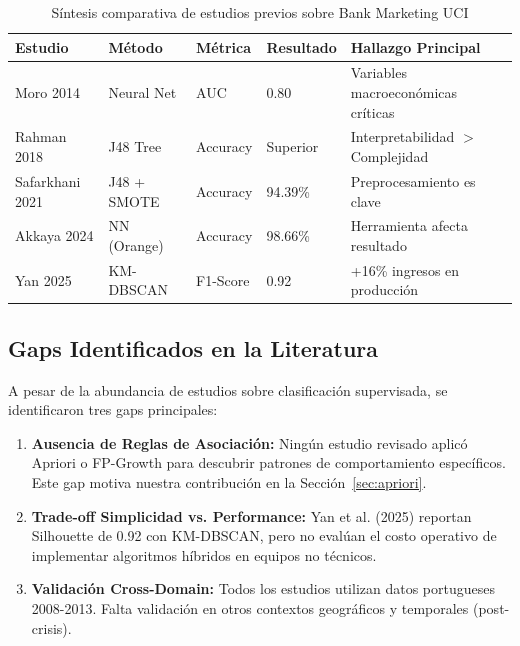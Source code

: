 \documentclass[12pt,letterpaper]{article}
\begin{document}
\begin{table}[H]
\centering
\caption{Síntesis comparativa de estudios previos sobre Bank Marketing UCI}
\label{tab:literatura}
\small
\begin{tabular}{llllp{5cm}}
\toprule
\textbf{Estudio} & \textbf{Método} & \textbf{Métrica} & \textbf{Resultado} & \textbf{Hallazgo Principal} \\
\midrule
Moro 2014 & Neural Net & AUC & 0.80 & Variables macroeconómicas críticas \\
\addlinespace
Rahman 2018 & J48 Tree & Accuracy & Superior & Interpretabilidad $>$ Complejidad \\
\addlinespace
Safarkhani 2021 & J48 + SMOTE & Accuracy & 94.39\% & Preprocesamiento es clave \\
\addlinespace
Akkaya 2024 & NN (Orange) & Accuracy & 98.66\% & Herramienta afecta resultado \\
\addlinespace
Yan 2025 & KM-DBSCAN & F1-Score & 0.92 & +16\% ingresos en producción \\
\bottomrule
\end{tabular}
\end{table}

\subsection{Gaps Identificados en la Literatura}

A pesar de la abundancia de estudios sobre clasificación supervisada, se identificaron tres gaps principales:

\begin{enumerate}
    \item \textbf{Ausencia de Reglas de Asociación:} Ningún estudio revisado aplicó Apriori o FP-Growth para descubrir patrones de comportamiento específicos. Este gap motiva nuestra contribución en la Sección~\ref{sec:apriori}.
    
    \item \textbf{Trade-off Simplicidad vs. Performance:} Yan et al. (2025) reportan Silhouette de 0.92 con KM-DBSCAN, pero no evalúan el costo operativo de implementar algoritmos híbridos en equipos no técnicos.
    
    \item \textbf{Validación Cross-Domain:} Todos los estudios utilizan datos portugueses 2008-2013. Falta validación en otros contextos geográficos y temporales (post-crisis).
\end{enumerate}
\end{document}
